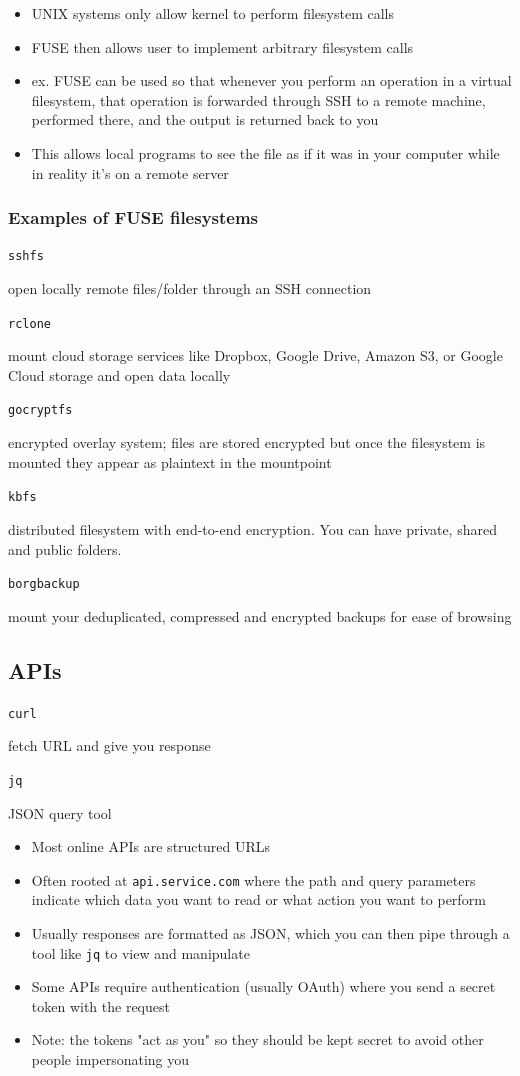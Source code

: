 \documentclass[letterpaper,12pt]{article}
\newcommand*{\lstitem}[1]{
  \setbox0\hbox{\lstinline{#1}}
  \item[\usebox0]
}
\begin{document}
\begin{itemize}
 \item UNIX systems only allow kernel to perform filesystem calls
 \item FUSE then allows user to implement arbitrary filesystem calls
 \item ex. FUSE can be used so that whenever you perform an operation in a virtual filesystem, that operation is forwarded through SSH to a remote machine, performed there, and the output is returned back to you
 \item This allows local programs to see the file as if it was in your computer while in reality it's on a remote server
\end{itemize}

\subsubsection{Examples of FUSE filesystems}
\begin{description}
 \lstitem{sshfs} open locally remote files/folder through an SSH connection
 \lstitem{rclone} mount cloud storage services like Dropbox, Google Drive, Amazon S3, or Google Cloud storage and open data locally
 \lstitem{gocryptfs} encrypted overlay system; files are stored encrypted but once the filesystem is mounted they appear as plaintext in the mountpoint
 \lstitem{kbfs} distributed filesystem with end-to-end encryption. You can have private, shared and public folders.
 \lstitem{borgbackup} mount your deduplicated, compressed and encrypted backups for ease of browsing
\end{description}

\subsection{APIs}
\begin{description}
 \lstitem{curl} fetch URL and give you response
 \lstitem{jq} JSON query tool
\end{description}
\begin{itemize}
 \item Most online APIs are structured URLs
 \item Often rooted at \lstinline{api.service.com} where the path and query parameters indicate which data you want to read or what action you want to perform
 \item Usually responses are formatted as JSON, which you can then pipe through a tool like \lstinline{jq} to view and manipulate
 \item Some APIs require authentication (usually OAuth) where you send a secret token with the request
 \item Note: the tokens "act as you" so they should be kept secret to avoid other people impersonating you
\end{itemize}
\end{document}
